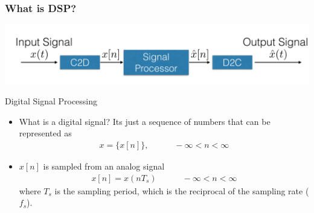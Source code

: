 \documentclass[mathserif,9pt]{beamer}
\begin{document}
\begin{frame}\frametitle{What is DSP?}\small
  \begin{center}
    \includegraphics[width=.9\textwidth]{dsp_flow_sampled.pdf}
  \end{center}
  \begin{block}{\small Digital Signal Processing}
  \begin{itemize}
    \item What is a digital signal? Its just a sequence of numbers that can be represented as 
      \begin{align}
         x = \{x[n]\}, \hspace{3em} -\infty < n <  \infty \nonumber
      \end{align}
    \item $x[n]$ is sampled from an analog signal
      \begin{align}
         x[n] = x(nT_s) \hspace{3em} -\infty < n <  \infty \nonumber
      \end{align}
      where $T_s$ is the sampling period, which is the reciprocal of the sampling rate ($f_s$). 
  \end{itemize}
  \end{block}
\end{frame}
\end{document}
